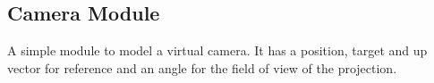 \subsection{Camera Module}
A simple module to model a virtual camera. It has a position, target and up vector for reference and an angle for the field of view of the projection.
